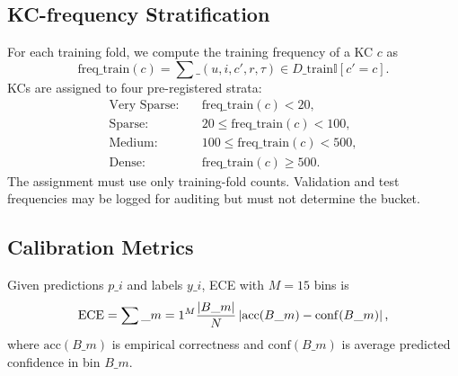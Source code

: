 \subsection{KC-frequency Stratification}
\label{sec:kc-strat}
For each training fold, we compute the training frequency of a KC $c$ as
\begin{equation}
\mathrm{freq}\_{\mathrm{train}}(c)=\sum\_{(u,i,c',r,\tau)\in D\_{\mathrm{train}}}\mathbb{I}[c'=c].
\end{equation}
KCs are assigned to four pre-registered strata:
\begin{align}
\text{Very Sparse:} &\quad \mathrm{freq}\_{\mathrm{train}}(c) < 20,\\
\text{Sparse:} &\quad 20 \le \mathrm{freq}\_{\mathrm{train}}(c) < 100,\\
\text{Medium:} &\quad 100 \le \mathrm{freq}\_{\mathrm{train}}(c) < 500,\\
\text{Dense:} &\quad \mathrm{freq}\_{\mathrm{train}}(c) \ge 500.
\end{align}
The assignment must use only training-fold counts. Validation and test frequencies may be logged for auditing but must not determine the bucket.

\subsection{Calibration Metrics}
Given predictions $p\_i$ and labels $y\_i$, ECE with $M=15$ bins is
\begin{equation}
\mathrm{ECE} = \sum\_{m=1}^{M}\frac{|B\_m|}{N}\left|\mathrm{acc}(B\_m)-\mathrm{conf}(B\_m)\right|,
\end{equation}
where $\mathrm{acc}(B\_m)$ is empirical correctness and $\mathrm{conf}(B\_m)$ is average predicted confidence in bin $B\_m$.

